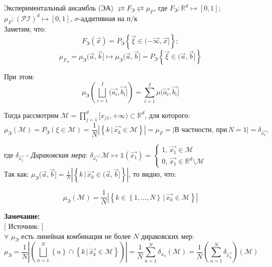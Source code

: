 \newpage

{}
Экспериментальный ансамбль (ЭА) $ \rightleftarrows F_{\text{Э}} \rightleftarrows \mu_F $,
где $ F_{\text{Э}} : \mathds{R}^d \longmapsto \left[0, 1\right] $;
$ \mu_F : \left(\mathcal{PI} \right)^d \longmapsto \left[0, 1\right] $, \linebreak
$\sigma$-аддитивная на п/к \\ [0.2cm]

Заметим, что:
\[
    F_{\text{Э}}\left(\overrightarrow{x}\right) =
    P_{\text{Э}}\left\{ \overrightarrow{\xi} \in ( -\overrightarrow{\infty}, \overrightarrow{x} ] \right\};
\]
\[
    \mu_{F_{\text{Э}}} = \mu_{\text{Э}}(\overrightarrow{a}, \overrightarrow{b}] \mapsto
    \mu_{\text{Э}}(\overrightarrow{a}, \overrightarrow{b}] =
    P_{\text{Э}}\left\{ \overrightarrow{\xi} \in (\overrightarrow{a}, \overrightarrow{b}] \right\}
\]

При этом:
\[
    \mu_{\text{Э}}\left( \bigsqcup_{i = 1}^I (\overrightarrow{a_i}, \overrightarrow{b_i}] \right) =
    \sum_{i = 1}^I\mu(\overrightarrow{a_i}, \overrightarrow{b_i}]
\]

Тогда рассмотрим $ \mathcal{M} = \prod_{j = 1}^d [ x_{j1}, +\infty ) \subset \mathds{R}^d $, для которого:
\[
    \mu_{\text{Э}}\left(\mathcal{M}\right) = P_{\text{Э}}\left(\xi \in \mathcal{M}\right) =
    \frac{1}{N}\left|\left\{ k \,|\, \overrightarrow{x_k} \in \mathcal{M} \right\}\right| = \mu_F =
    \Bigg| \text{В частности, при} \, N = 1 \Bigg| = \delta_{\overrightarrow{x_1}},
\]

где $ \delta_{\overrightarrow{x_1}} $ - \textit{Дираковская мера}: $ \delta_{\overrightarrow{x_1}} :
\mathcal{M} \mapsto \mathds{1} \left(\overrightarrow{x_1}\right) =
\begin{cases} 1,\, \overrightarrow{x_1} \in \mathcal{M} \\ 0,\, \overrightarrow{x_1} \in
\mathds{R}^d \setminus \mathcal{M} \end{cases} $ \\ [1.0cm]

Так как: $ \mu_{\text{Э}}( \overrightarrow{a}, \overrightarrow{b} ] = \frac{1}{N}
\left|\left\{ k \,|\, \overrightarrow{x_k} \in (\overrightarrow{a}, \overrightarrow{b}] \right\}\right| $,
то видно, что:

\[
    \mu_{Э}\left(\mathcal{M}\right) = \frac{1}{N}
    \left|\left\{ k \in \left\{1, \dots, N\right\} \,|\, \overrightarrow{x_k}
                  \in \mathcal{M} \right\}\right|
\]

{\bf\large Замечание:} \\ $ [ $ Источник:  $ ] $ \\
$ \forall \,\, \mu_{\text{Э}} $ есть линейная комбинация не более $ N $ дираковских мер: \\
\[
    \mu_{\text{Э}} =
    \frac{1}{N} \left|\left( \bigsqcup_{n = 1}^N \left\{n\right\} \cap
        \left\{k \,|\, \overrightarrow{x_k} \in \mathcal{M}\right\} \right)\right| =
    \frac{1}{N} \sum_{n = 1}^{N}\delta_{x_n}\left(\mathcal{M}\right) =
    \frac{1}{N} \left(\sum_{n = 1}^{N} \delta_{\overrightarrow{x_n}}\right)\left(\mathcal{M}\right)
\]
